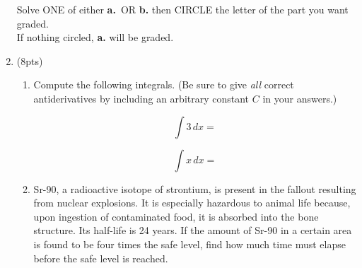 \documentclass[fleqn,12pt]{article}
\newcommand{\<}{\ensuremath{\langle}}
\renewcommand{\>}{\ensuremath{\rangle}}
\begin{document}
\begin{enumerate}
\newpage
Solve ONE of either {\bf a.}~OR {\bf b.} then
CIRCLE the letter of the part you want graded.\\[5pt]  If nothing circled, {\bf a.} will be graded.

\item (8pts) 
  \begin{enumerate}[{\bf a.}]
  \item Compute the following integrals. (Be sure to give \emph{all} correct antiderivatives by
    including an arbitrary constant $C$ in your answers.)

    \[
    \int 3 \, dx = 
    \]

    \[
    \int x \, dx = 
    \]

  \vskip1cm


  \item
    Sr-90, a radioactive isotope of strontium, is present in the
    fallout resulting from nuclear explosions. It is especially hazardous to animal
    life because, upon ingestion of contaminated food, it is
    absorbed into the bone structure. Its half-life is 24 years. If the amount of 
    Sr-90 in a certain area is found to be four times the safe level, 
    find how much time must elapse before the safe level is reached. 
  \end{enumerate}

\vfill


\end{enumerate}
\end{document}

